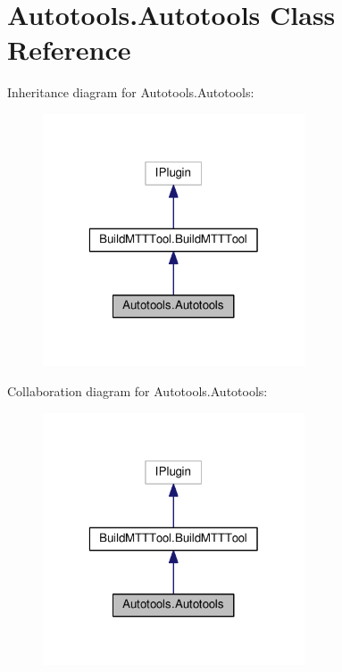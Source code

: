 \hypertarget{classAutotools_1_1Autotools}{\section{Autotools.\-Autotools Class Reference}
\label{classAutotools_1_1Autotools}
}


Inheritance diagram for Autotools.\-Autotools\-:
\nopagebreak
\begin{figure}[H]
\begin{center}
\leavevmode
\includegraphics[width=220pt]{classAutotools_1_1Autotools__inherit__graph}
\end{center}
\end{figure}


Collaboration diagram for Autotools.\-Autotools\-:
\nopagebreak
\begin{figure}[H]
\begin{center}
\leavevmode
\includegraphics[width=220pt]{classAutotools_1_1Autotools__coll__graph}
\end{center}
\end{figure}
